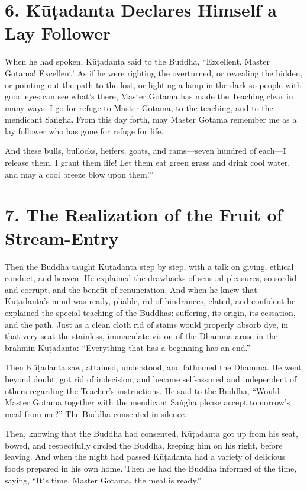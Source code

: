 \documentclass[12pt,openany]{book}%
\begin{document}
\section*{6. \textsanskrit{Kūṭadanta} Declares Himself a Lay Follower }

When he had spoken, \textsanskrit{Kūṭadanta} said to the Buddha, “Excellent, Master Gotama! Excellent! As if he were righting the overturned, or revealing the hidden, or pointing out the path to the lost, or lighting a lamp in the dark so people with good eyes can see what’s there, Master Gotama has made the Teaching clear in many ways. I go for refuge to Master Gotama, to the teaching, and to the mendicant \textsanskrit{Saṅgha}. From this day forth, may Master Gotama remember me as a lay follower who has gone for refuge for life. 

And these bulls, bullocks, heifers, goats, and rams—seven hundred of each—I release them, I grant them life! Let them eat green grass and drink cool water, and may a cool breeze blow upon them!” 

\section*{7. The Realization of the Fruit of Stream-Entry }

Then the Buddha taught \textsanskrit{Kūṭadanta} step by step, with a talk on giving, ethical conduct, and heaven. He explained the drawbacks of sensual pleasures, so sordid and corrupt, and the benefit of renunciation. And when he knew that \textsanskrit{Kūṭadanta}’s mind was ready, pliable, rid of hindrances, elated, and confident he explained the special teaching of the Buddhas: suffering, its origin, its cessation, and the path. Just as a clean cloth rid of stains would properly absorb dye, in that very seat the stainless, immaculate vision of the Dhamma arose in the brahmin \textsanskrit{Kūṭadanta}: “Everything that has a beginning has an end.” 

Then \textsanskrit{Kūṭadanta} saw, attained, understood, and fathomed the Dhamma. He went beyond doubt, got rid of indecision, and became self-assured and independent of others regarding the Teacher’s instructions. He said to the Buddha, “Would Master Gotama together with the mendicant \textsanskrit{Saṅgha} please accept tomorrow’s meal from me?” The Buddha consented in silence. 

Then, knowing that the Buddha had consented, \textsanskrit{Kūṭadanta} got up from his seat, bowed, and respectfully circled the Buddha, keeping him on his right, before leaving. And when the night had passed \textsanskrit{Kūṭadanta} had a variety of delicious foods prepared in his own home. Then he had the Buddha informed of the time, saying, “Itʼs time, Master Gotama, the meal is ready.” 
\end{document}
